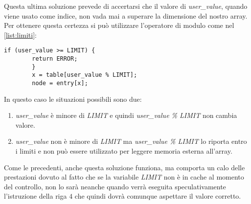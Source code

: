 		Questa ultima soluzione prevede di accertarsi che il valore di \emph{user\_value}, quando viene usato come indice, non vada mai a superare la dimensione del nostro array. Per ottenere questa certezza si può utilizzare l'operatore di modulo come nel \cref{list:limiti}:
		
		\begin{lstlisting}[caption={rispetto dei limiti forzato},label={list:limiti}]
		if (user_value >= LIMIT) {
		return ERROR;
		}
		x = table[user_value % LIMIT]; 
		node = entry[x];
		\end{lstlisting}
		
		In questo caso le situazioni possibili sono due:
		
		\begin{enumerate}
			\item \emph{user\_value} è minore di \emph{LIMIT} e quindi \emph{user\_value \% LIMIT} non cambia valore.
			\item \emph{user\_value} non è minore di \emph{LIMIT} ma \emph{user\_value \% LIMIT} lo riporta entro i limiti e non può essere utilizzato per leggere memoria esterna all'array.
		\end{enumerate}
	
		Come le precedenti, anche questa soluzione funziona, ma comporta un calo delle prestazioni dovuto al fatto che se la variabile \emph{LIMIT} non è in cache al momento del controllo, non lo sarà neanche quando verrà eseguita speculativamente l'istruzione della riga $4$ che quindi dovrà comunque aspettare il valore corretto. 